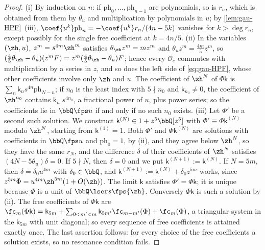 \begin{proof}
(i) By induction on $n$: if $\mathrm{ph}_0,\dots,\mathrm{ph}_{n-1}$ are polynomials, so is $r_n$, which is obtained from them by $\theta_u$ and multiplication by polynomials in $u$; by \cref{lem:gau-HPF}~(iii), $\coef{u^k}\mathrm{ph}_n=-\coef{u^k}r_n/(4n-5k)$ vanishes for $k>\deg r_n$, except possibly for the single free coefficient at $k=4n/5$. (ii) In the variables $(\zh,u)$, $z^m=s^{4m}\zh^m$ satisfies $\theta_{\zh}z^m=mz^m$ and $\theta_uz^m=\frac{4m}5z^m$, so $(\frac45\theta_{\zh}-\theta_u)(z^mF)=z^m(\frac45\theta_{\zh}-\theta_u)F$; hence every $\mathscr O_e$ commutes with multiplication by a series in $z$, and so does the left side of \eqref{eq:gau-HPF}, whose other coefficients involve only $\zh$ and $u$. The coefficient of $\zh^N$ of $\Phi\mathsf k$ is $\sum_n\mathsf k_ns^{4n}\mathrm{ph}_{N-n}$; if $n_0$ is the least index with $5\nmid n_0$ and $\mathsf k_{n_0}\neq0$, the coefficient of $\zh^{n_0}$ contains $\mathsf k_{n_0}s^{4n_0}$, a fractional power of $u$, plus power series; so the coefficients lie in $\bbQ\fps u$ if and only if no such $n_0$ exists. (iii) Let $\Phi'$ be a second such solution. We construct $\mathsf k^{(N)}\in1+z^5\bbQ[z^5]$ with $\Phi'\equiv\Phi\mathsf k^{(N)}$ modulo $\zh^N$, starting from $\mathsf k^{(1)}=1$. Both $\Phi'$ and $\Phi\mathsf k^{(N)}$ are solutions with coefficients in $\bbQ\fps u$ and $\mathrm{ph}_0=1$, by (ii), and they agree below $\zh^N$, so they have the same $r_N$, and the difference $\delta$ of their coefficients of $\zh^N$ satisfies $(4N-5\theta_u)\delta=0$. If $5\nmid N$, then $\delta=0$ and we put $\mathsf k^{(N+1)}:=\mathsf k^{(N)}$. If $N=5m$, then $\delta=\delta_0u^{4m}$ with $\delta_0\in\bbQ$, and $\mathsf k^{(N+1)}:=\mathsf k^{(N)}+\delta_0z^{5m}$ works, since $z^{5m}\Phi=u^{4m}\zh^{5m}(1+O(\zh))$. The limit $\mathsf k$ satisfies $\Phi'=\Phi\mathsf k$; it is unique because $\Phi$ is a unit of $\bbQ\lser s\fps{\zh}$. Conversely $\Phi\mathsf k$ is such a solution by (ii). The free coefficients of $\Phi\mathsf k$ are $\fc_m(\Phi\mathsf k)=\mathsf k_{5m}+\sum_{0<m'<m}\mathsf k_{5m'}\fc_{m-m'}(\Phi)+\fc_m(\Phi)$, a triangular system in the $\mathsf k_{5m}$ with unit diagonal; so every sequence of free coefficients is attained exactly once. The last assertion follows: for every choice of the free coefficients a solution exists, so no resonance condition fails.
\end{proof}


